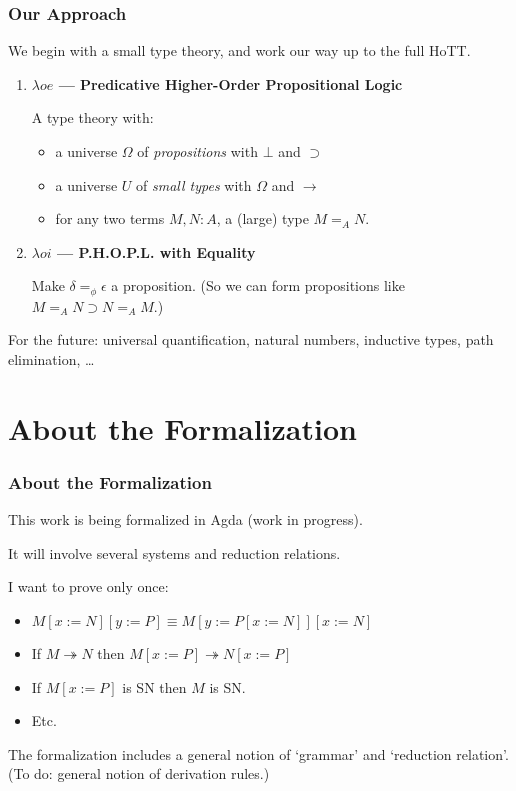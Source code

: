\documentclass[handout]{beamer}
\begin{document}
\begin{frame}
\frametitle{Our Approach}
We begin with a small type theory, and work our way up to the full HoTT. %
\begin{enumerate}
\item \textbf{$\lambda o e$ --- Predicative Higher-Order Propositional Logic}

 A type theory with:
  \begin{itemize}
  \item a universe $\Omega$ of \emph{propositions} with $\bot$ and $\supset$
  \item a universe $U$ of \emph{small types} with $\Omega$ and $\rightarrow$
  \item for any two terms $M, N : A$, a (large) type $M =_A N$.
  \end{itemize}
\item \textbf{$\lambda o i$ --- P.H.O.P.L. with Equality}

Make $\delta =_\phi \epsilon$ a proposition.  (So we can form propositions like $M =_A N \supset N =_A M$.)
\end{enumerate}
For the future: universal quantification, natural numbers, inductive types, path elimination, \ldots
\end{frame}

\section{About the Formalization}

\begin{frame}
\frametitle{About the Formalization}
This work is being formalized in Agda (work in progress).
\pause

It will involve several systems and reduction relations.

I want to prove only once:
\pause
\begin{itemize}[<+->]
\item
$M[x:=N][y:=P] \equiv M[y:=P[x:=N]][x:=N]$
\item
If $M \twoheadrightarrow N$ then $M[x:=P] \twoheadrightarrow N[x:=P]$
\item
If $M[x:=P]$ is SN then $M$ is SN.
\item
Etc.
\end{itemize}
\pause
The formalization includes a general notion of `grammar' and `reduction relation'.  (To do: general notion of derivation rules.)
\end{frame}
\end{document}
